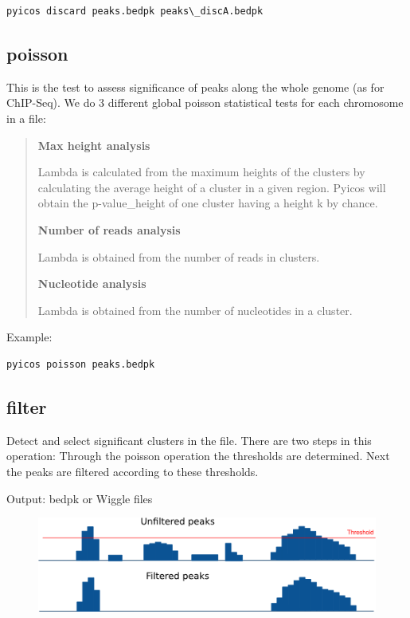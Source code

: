 \documentclass[letterpaper,10pt,english]{sphinxmanual}
\begin{document}
\begin{Verbatim}[commandchars=\\\{\}]
pyicos discard peaks.bedpk peaks\_discA.bedpk
\end{Verbatim}


\subsection{poisson}
\label{pyicos:poisson}
This is the test to assess significance of peaks along the whole genome (as for ChIP-Seq). We do 3 different global poisson statistical tests for each chromosome in a file:
\begin{quote}

\textbf{Max height analysis}

Lambda is calculated from the maximum heights of the clusters by calculating the average height of a cluster in a given region. Pyicos will obtain the p-value\_height of one cluster having a height k by chance.

\textbf{Number of reads analysis}

Lambda is obtained from the number of reads in clusters.

\textbf{Nucleotide analysis}

Lambda is obtained from the number of nucleotides in a cluster.
\end{quote}

Example:

\begin{Verbatim}[commandchars=\\\{\}]
pyicos poisson peaks.bedpk
\end{Verbatim}


\subsection{filter}
\label{pyicos:filter}
Detect and select significant clusters in the file. There are two steps in this operation: Through the poisson operation the thresholds are determined. Next the peaks are filtered according to these thresholds.

Output: bedpk or Wiggle files
\begin{figure}[htbp]
\centering

\includegraphics{Filter.png}
\end{figure}
\end{document}
